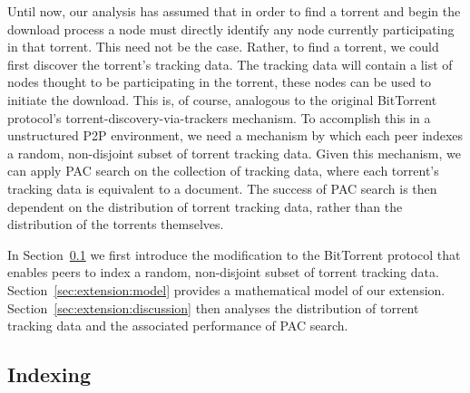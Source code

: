 Until now, our analysis has assumed that in order to find a torrent and begin the download process a node must directly identify any node currently participating in that torrent. This need not be the case. Rather, to find a torrent, we could first discover the torrent's tracking data. The tracking data will contain a list of nodes thought to be participating in the torrent, these nodes can be used to initiate the download. This is, of course, analogous to the original BitTorrent protocol's torrent-discovery-via-trackers mechanism. To accomplish this in a unstructured P2P environment, we need a mechanism by which each peer indexes a random, non-disjoint subset of torrent tracking data. Given this mechanism, we can apply PAC search on the collection of tracking data, where each torrent's tracking data is equivalent to a document. The success of PAC search is then dependent on the distribution of torrent tracking data, rather than the distribution of the torrents themselves. 

In Section~\ref{sec:extension:indexing} we first introduce the modification to the BitTorrent protocol that enables peers to index a random, non-disjoint subset of torrent tracking data. Section~\ref{sec:extension:model} provides a mathematical model of our extension. Section~\ref{sec:extension:discussion} then analyses the distribution of torrent tracking data and the associated performance of PAC search.

\subsection{Indexing}\label{sec:extension:indexing}

